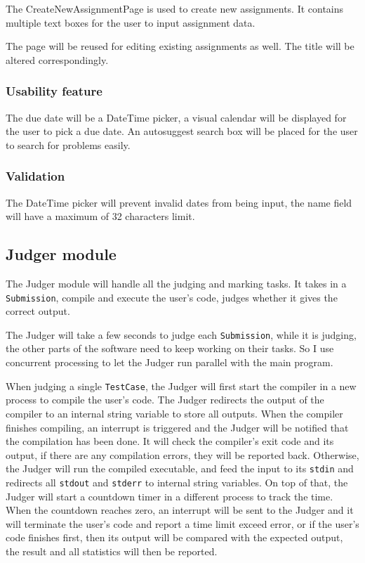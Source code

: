 \documentclass[a4paper]{report}
\begin{document}
The CreateNewAssignmentPage is used to create new assignments. It contains multiple text boxes for the user to input assignment data.

The page will be reused for editing existing assignments as well. The title will be altered correspondingly.

\subsubsection{Usability feature}

The due date will be a DateTime picker, a visual calendar will be displayed for the user to pick a due date. An autosuggest search box will be placed for the user to search for problems easily.

\subsubsection{Validation}

The DateTime picker will prevent invalid dates from being input, the name field will have a maximum of 32 characters limit.

\subsection{Judger module}

The Judger module will handle all the judging and marking tasks. It takes in a \texttt{Submission}, compile and execute the user's code, judges whether it gives the correct output.

The Judger will take a few seconds to judge each \texttt{Submission}, while it is judging, the other parts of the software need to keep working on their tasks. So I use concurrent processing to let the Judger run parallel with the main program.

When judging a single \texttt{TestCase}, the Judger will first start the compiler in a new process to compile the user's code. The Judger redirects the output of the compiler to an internal string variable to store all outputs. When the compiler finishes compiling, an interrupt is triggered and the Judger will be notified that the compilation has been done. It will check the compiler's exit code and its output, if there are any compilation errors, they will be reported back. Otherwise, the Judger will run the compiled executable, and feed the input to its \texttt{stdin} and redirects all \texttt{stdout} and \texttt{stderr} to internal string variables. On top of that, the Judger will start a countdown timer in a different process to track the time. When the countdown reaches zero, an interrupt will be sent to the Judger and it will terminate the user's code and report a time limit exceed error, or if the user's code finishes first, then its output will be compared with the expected output, the result and all statistics will then be reported.
\end{document}
